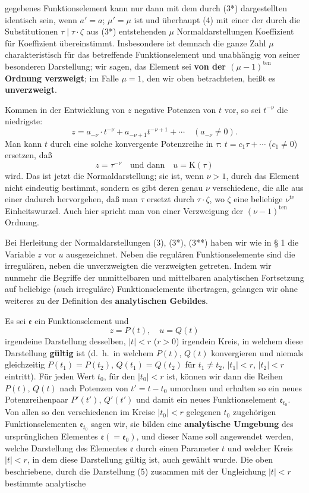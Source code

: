 \documentclass{article}
\begin{document}
gegebenes Funktionselement kann nur dann mit dem durch (3*) dargestellten identisch sein, wenn $a' = a$; $\mu' = \mu$ ist und überhaupt (4) mit einer der durch die Substitutionen $\tau \mid \tau \cdot \zeta$ aus (3*) entstehenden $\mu$ Normaldarstellungen Koeffizient für Koeffizient übereinstimmt. Insbesondere ist demnach die ganze Zahl $\mu$ charakteristisch für das betreffende Funktionselement und unabhängig von seiner besonderen Darstellung; wir sagen, das Element sei \textbf{von der $(\mu - 1)^{\text{ten}}$ Ordnung verzweigt}; im Falle $\mu = 1$, den wir oben betrachteten, heißt es \textbf{unverzweigt}.

Kommen in der Entwicklung von $z$ negative Potenzen von $t$ vor, so sei $t^{-\nu}$ die niedrigste:
\[ z = a_{-\nu} \cdot t^{-\nu} + a_{-\nu+1} t^{-\nu+1} + \cdots \quad (a_{-\nu} \neq 0). \]
Man kann $t$ durch eine solche konvergente Potenzreihe in $\tau$: $t = c_1 \tau + \cdots$ ($c_1 \neq 0$) ersetzen, daß
\[ z = \tau^{-\nu} \quad \text{und dann} \quad u = \mathrm{K}(\tau) \tag{3**} \]
wird. Das ist jetzt die Normaldarstellung; sie ist, wenn $\nu > 1$, durch das Element nicht eindeutig bestimmt, sondern es gibt deren genau $\nu$ verschiedene, die alle aus einer dadurch hervorgehen, daß man $\tau$ ersetzt durch $\tau \cdot \zeta$, wo $\zeta$ eine beliebige $\nu^{\text{te}}$ Einheitswurzel. Auch hier spricht man von einer Verzweigung der $(\nu - 1)^{\text{ten}}$ Ordnung.

Bei Herleitung der Normaldarstellungen (3), (3*), (3**) haben wir wie in § 1 die Variable $z$ vor $u$ ausgezeichnet. Neben die regulären Funktionselemente sind die irregulären, neben die unverzweigten die verzweigten getreten. Indem wir nunmehr die Begriffe der unmittelbaren und mittelbaren analytischen Fortsetzung auf beliebige (auch irreguläre) Funktionselemente übertragen, gelangen wir ohne weiteres zu der Definition des \textbf{analytischen Gebildes}.

Es sei $\mathfrak{e}$ ein Funktionselement und
\[ z = P(t), \quad u = Q(t) \tag{5} \]
irgendeine Darstellung desselben, $|t| < r$ ($r > 0$) irgendein Kreis, in welchem diese Darstellung \textbf{gültig} ist (d.\ h.\ in welchem $P(t)$, $Q(t)$ konvergieren und niemals gleichzeitig $P(t_1) = P(t_2)$, $Q(t_1) = Q(t_2)$ für $t_1 \neq t_2$, $|t_1| < r$, $|t_2| < r$ eintritt). Für jeden Wert $t_0$, für den $|t_0| < r$ ist, können wir dann die Reihen $P(t)$, $Q(t)$ nach Potenzen von $t' = t - t_0$ umordnen und erhalten so ein neues Potenzreihenpaar $P'(t')$, $Q'(t')$ und damit ein neues Funktionselement $\mathfrak{e}_{t_0}$. Von allen so den verschiedenen im Kreise $|t_0| < r$ gelegenen $t_0$ zugehörigen Funktionselementen $\mathfrak{e}_{t_0}$ sagen wir, sie bilden eine \textbf{analytische Umgebung} des ursprünglichen Elementes $\mathfrak{e} (= \mathfrak{e}_0)$, und dieser Name soll angewendet werden, welche Darstellung des Elementes $\mathfrak{e}$ durch einen Parameter $t$ und welcher Kreis $|t| < r$, in dem diese Darstellung gültig ist, auch gewählt wurde. Die oben beschriebene, durch die Darstellung (5) zusammen mit der Ungleichung $|t| < r$ bestimmte analytische
\end{document}
